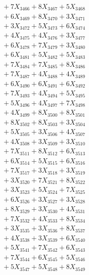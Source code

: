 \documentclass[a4paper,10pt]{article}
\begin{document}
{\begin{align}
&\;  + 7 X_{3466} + 8 X_{3467} + 5 X_{3468} \\[0.3ex]
&\;  + 6 X_{3469} + 8 X_{3470} + 3 X_{3471} \\[0.3ex]
&\;  + 3 X_{3472} + 5 X_{3473} + 6 X_{3474} \\[0.3ex]
&\;  + 4 X_{3475} + 4 X_{3476} + 3 X_{3477} \\[0.3ex]
&\;  + 6 X_{3478} + 7 X_{3479} + 3 X_{3480} \\[0.3ex]
&\;  + 6 X_{3481} + 5 X_{3482} + 5 X_{3483} \\[0.3ex]
&\;  + 7 X_{3484} + 7 X_{3485} + 8 X_{3486} \\[0.3ex]
&\;  + 7 X_{3487} + 4 X_{3488} + 4 X_{3489} \\[0.5ex]\allowbreak
&\;  + 6 X_{3490} + 6 X_{3491} + 6 X_{3492} \\[0.3ex]
&\;  + 7 X_{3493} + 4 X_{3494} + 5 X_{3495} \\[0.3ex]
&\;  + 5 X_{3496} + 4 X_{3497} + 7 X_{3498} \\[0.3ex]
&\;  + 4 X_{3499} + 8 X_{3500} + 8 X_{3501} \\[0.3ex]
&\;  + 8 X_{3502} + 8 X_{3503} + 3 X_{3504} \\[0.3ex]
&\;  + 5 X_{3505} + 3 X_{3506} + 4 X_{3507} \\[0.3ex]
&\;  + 4 X_{3508} + 3 X_{3509} + 3 X_{3510} \\[0.3ex]
&\;  + 7 X_{3511} + 8 X_{3512} + 6 X_{3513} \\[0.3ex]
&\;  + 6 X_{3514} + 5 X_{3515} + 6 X_{3516} \\[0.3ex]
&\;  + 7 X_{3517} + 3 X_{3518} + 3 X_{3519} \\[0.5ex]\allowbreak
&\;  + 3 X_{3520} + 7 X_{3521} + 8 X_{3522} \\[0.3ex]
&\;  + 3 X_{3523} + 5 X_{3524} + 7 X_{3525} \\[0.3ex]
&\;  + 6 X_{3526} + 3 X_{3527} + 3 X_{3528} \\[0.3ex]
&\;  + 8 X_{3529} + 3 X_{3530} + 4 X_{3531} \\[0.3ex]
&\;  + 7 X_{3532} + 4 X_{3533} + 8 X_{3534} \\[0.3ex]
&\;  + 3 X_{3535} + 3 X_{3536} + 8 X_{3537} \\[0.3ex]
&\;  + 4 X_{3538} + 3 X_{3539} + 6 X_{3540} \\[0.3ex]
&\;  + 5 X_{3541} + 7 X_{3542} + 6 X_{3543} \\[0.3ex]
&\;  + 7 X_{3544} + 6 X_{3545} + 5 X_{3546} \\[0.3ex]
&\;  + 5 X_{3547} + 5 X_{3548} + 8 X_{3549} \\[0.5ex]\allowbreak

\end{align}}
\end{document}

